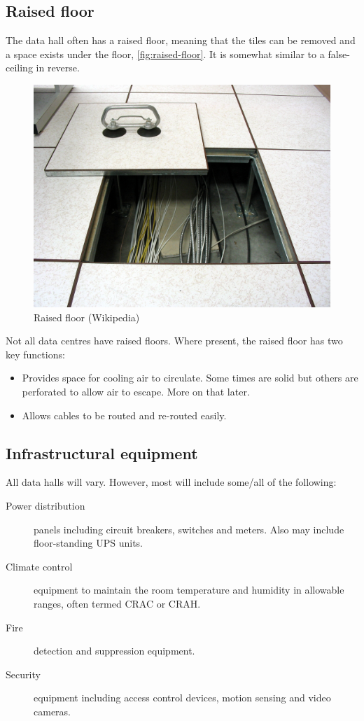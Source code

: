 \subsection{Raised floor}

The data hall often has a raised floor, meaning that the tiles can be removed and a space exists under the floor, \autoref{fig:raised-floor}.
It is somewhat similar to a false-ceiling in reverse.

\begin{figure}[htbp]
  \centering
  \includegraphics[width=0.75\linewidth]{raised_floor_wikipedia}
  \caption{Raised floor (Wikipedia)}
  \label{fig:raised-floor}
\end{figure}

Not all data centres have raised floors.
Where present, the raised floor has two key functions:
\begin{itemize}
\item Provides space for cooling air to circulate. Some times are solid but others are perforated to allow air to escape. More on that later.
\item Allows cables to be routed and re-routed easily. 
\end{itemize}

\subsection{Infrastructural equipment}

All data halls will vary.
However, most will include some/all of the following:
\begin{description}
\item[Power distribution] panels including circuit breakers, switches and meters. Also may include floor-standing UPS units.
\item[Climate control] equipment to maintain the room temperature and humidity in allowable ranges, often termed CRAC or CRAH.
\item[Fire] detection and suppression equipment.
\item[Security] equipment including access control devices, motion sensing and video cameras.
\end{description}

